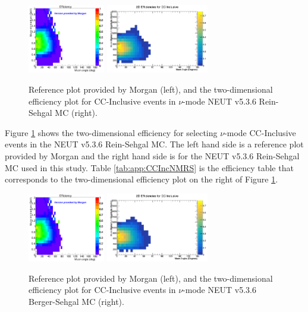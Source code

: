 \documentclass[11pt]{article}
\begin{document}
\begin{figure}[H]
\centering
\includegraphics[width=0.3\textwidth]{CCInclusivePlots/MorgansCCInclusiveSample.png}
\includegraphics[width=0.4\textwidth]{CCInclusivePlots/2DEffCompareNMRS.png}
\caption{Reference plot provided by Morgan (left), and the two-dimensional efficiency plot for CC-Inclusive events in $\nu$-mode NEUT v5.3.6 Rein-Sehgal MC (right).}
\label{fig:TwoDEfficiencyRS}
\end{figure}

Figure \ref*{fig:TwoDEfficiencyRS} shows the two-dimensional efficiency for selecting $\nu$-mode CC-Inclusive events in the NEUT v5.3.6 Rein-Sehgal MC. The left hand side is a reference plot provided by Morgan and the right hand side is for the NEUT v5.3.6 Rein-Sehgal MC used in this study. Table \ref*{tab:app:CCIncNMRS} is the efficiency table that corresponds to the two-dimensional efficiency plot on the right of Figure \ref*{fig:TwoDEfficiencyRS}.

\begin{figure}[H]
\centering
\includegraphics[width=0.3\textwidth]{CCInclusivePlots/MorgansCCInclusiveSample.png}
\includegraphics[width=0.4\textwidth]{CCInclusivePlots/2DEffCompareNMBS.png}
\caption{Reference plot provided by Morgan (left), and the two-dimensional efficiency plot for CC-Inclusive events in $\nu$-mode NEUT v5.3.6 Berger-Sehgal MC (right).}
\label{fig:TwoDEfficiencyBS}
\end{figure}
\end{document}
